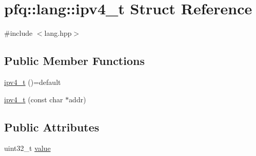 \hypertarget{structpfq_1_1lang_1_1ipv4__t}{\section{pfq\+:\+:lang\+:\+:ipv4\+\_\+t Struct Reference}
\label{structpfq_1_1lang_1_1ipv4__t}
}


{\ttfamily \#include $<$lang.\+hpp$>$}

\subsection*{Public Member Functions}
\begin{DoxyCompactItemize}
\item 
\hyperlink{structpfq_1_1lang_1_1ipv4__t_a3237166f3fab90a77846d9656b0482c8}{ipv4\+\_\+t} ()=default
\item 
\hyperlink{structpfq_1_1lang_1_1ipv4__t_a86fa55f6ef31157415d65d43ce228fae}{ipv4\+\_\+t} (const char $\ast$addr)
\end{DoxyCompactItemize}
\subsection*{Public Attributes}
\begin{DoxyCompactItemize}
\item 
uint32\+\_\+t \hyperlink{structpfq_1_1lang_1_1ipv4__t_a5080d5f65781ad95e605d066f1693502}{value}
\end{DoxyCompactItemize}


